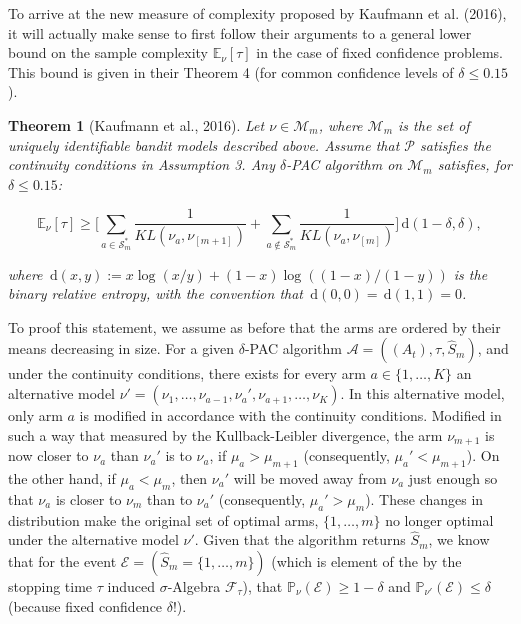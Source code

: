\documentclass[12pt,]{article}
\newtheorem{theorem}{Theorem}
\newcommand{\der}{\,\text{d}}
\begin{document}
To arrive at the new measure of complexity proposed by Kaufmann et al.
(2016), it will actually make sense to first follow their arguments to a
general lower bound on the sample complexity \(\mathbb{E}_{\nu}[\tau]\)
in the case of fixed confidence problems. This bound is given in their
Theorem 4 (for common confidence levels of \(\delta \leq 0.15\)).

\begin{theorem}[Kaufmann et al., 2016] \label{theorem:KaufmannEtAlTheorem4}
Let $\nu \in \mathcal{M}_m$, where $\mathcal{M}_m$ is the set of uniquely identifiable bandit models described above. Assume that $\mathcal{P}$ satisfies the continuity conditions in Assumption 3. Any $\delta$-PAC algorithm on $\mathcal{M}_m$ satisfies, for $\delta \leq 0.15$:

\begin{equation*}
\mathbb{E}_{\nu}[\tau] \geq \Big[ \sum_{a \in \mathcal{S}^*_m} \frac{1}{KL(\nu_a, \nu_{[m+1]})} + \sum_{a \notin \mathcal{S}^*_m} \frac{1}{KL(\nu_a, \nu_{[m]})} \Big] \der(1-\delta, \delta),
\end{equation*}

where $\der(x,y) := x \log(x/y) + (1-x) \log((1-x)/(1-y))$ is the binary relative entropy, with the convention that $\der(0,0) = \der(1,1) = 0$.
\end{theorem}

To proof this statement, we assume as before that the arms are ordered
by their means decreasing in size. For a given \(\delta\)-PAC algorithm
\(\mathcal{A} = ((A_t), \tau, \hat{S}_m)\), and under the continuity
conditions, there exists for every arm \(a \in \{1, \dots, K\}\) an
alternative model
\(\nu' = (\nu_1, \dots, \nu_{a-1}, \nu_a', \nu_{a+1}, \dots, \nu_K)\).
In this alternative model, only arm \(a\) is modified in accordance with
the continuity conditions. Modified in such a way that measured by the
Kullback-Leibler divergence, the arm \(\nu_{m+1}\) is now closer to
\(\nu_a\) than \(\nu_a'\) is to \(\nu_a\), if \(\mu_a > \mu_{m+1}\)
(consequently, \(\mu_a' < \mu_{m+1}\)). On the other hand, if
\(\mu_a < \mu_{m}\), then \(\nu_a'\) will be moved away from \(\nu_a\)
just enough so that \(\nu_a\) is closer to \(\nu_m\) than to \(\nu_a'\)
(consequently, \(\mu_a' > \mu_m\)). These changes in distribution make
the original set of optimal arms, \(\{1,\dots,m\}\) no longer optimal
under the alternative model \(\nu'\). Given that the algorithm returns
\(\hat{S}_m\), we know that for the event
\(\mathcal{E} = (\hat{S}_m = \{1, \dots, m\})\) (which is element of the
by the stopping time \(\tau\) induced \(\sigma\)-Algebra
\(\mathcal{F}_{\tau}\)), that
\(\mathbb{P}_{\nu}(\mathcal{E}) \geq 1-\delta\) and
\(\mathbb{P}_{\nu'}(\mathcal{E}) \leq \delta\) (because fixed confidence
\(\delta\)!).
\end{document}
